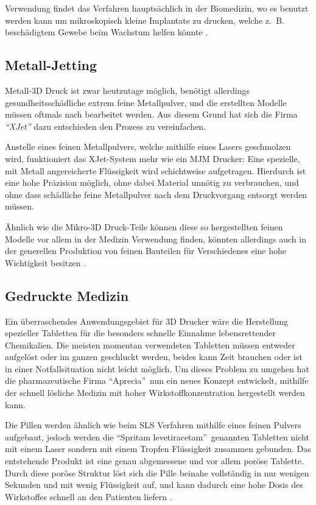 Verwendung findet das Verfahren hauptsächlich in der Biomedizin, wo es benutzt werden kann um mikroskopisch kleine Implantate zu drucken, welche z.~B. beschädigtem Gewebe beim Wachstum helfen könnte \parencite{MICROPRINT}.

\subsection{Metall-Jetting}
Metall-3D Druck ist zwar heutzutage möglich, benötigt allerdings gesundheitsschädliche extrem feine Metallpulver, und die erstellten Modelle müssen oftmals nach bearbeitet werden. Aus diesem Grund hat sich die Firma \emph{\textquotedblleft XJet\textquotedblright} dazu entschieden den Prozess zu vereinfachen. 

Anstelle eines feinen Metallpulvers, welche mithilfe eines Lasers geschmolzen wird, funktioniert das XJet-System mehr wie ein MJM Drucker: Eine spezielle, mit Metall angereicherte Flüssigkeit wird schichtweise aufgetragen. Hierdurch ist eine hohe Präzision möglich, ohne dabei Material unnötig zu verbrauchen, und ohne dass schädliche feine Metallpulver nach dem Druckvorgang entsorgt werden müssen.

Ähnlich wie die Mikro-3D Druck-Teile können diese so hergestellten feinen Modelle vor allem in der Medizin Verwendung finden, könnten allerdings auch in der generellen Produktion von feinen Bauteilen für Verschiedenes eine hohe Wichtigkeit besitzen \parencite{XJET}.

\subsection{Gedruckte Medizin}
Ein überraschendes Anwendungsgebiet für 3D Drucker wäre die Herstellung spezieller Tabletten für die besonders schnelle Einnahme lebensrettender Chemikalien. Die meisten momentan verwendeten Tabletten müssen entweder aufgelöst oder im ganzen geschluckt werden, beides kann Zeit brauchen oder ist in einer Notfallsituation nicht leicht möglich. Um dieses Problem zu umgehen hat die pharmazeutische Firma \textquotedblleft Aprecia\textquotedblright ~nun ein neues Konzept entwickelt, mithilfe der schnell lösliche Medizin mit hoher Wirkstoffkonzentration hergestellt werden kann.

Die Pillen werden ähnlich wie beim SLS Verfahren mithilfe eines feinen Pulvers aufgebaut, jedoch werden die \textquotedblleft Spritam levetiracetam\textquotedblright ~genannten Tabletten nicht mit einem Laser sondern mit einem Tropfen Flüssigkeit zusammen gebunden. Das entstehende Produkt ist eine genau abgemessene und vor allem poröse Tablette. Durch diese poröse Struktur löst sich die Pille beinahe vollständig in nur wenigen Sekunden und mit wenig Flüssigkeit auf, und kann dadurch eine hohe Dosis des Wirkstoffes schnell an den Patienten liefern \parencite{Printed_Drug}.

